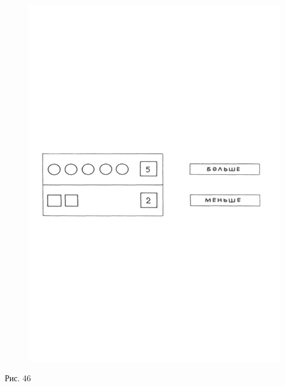 \documentclass[a5paper]{book}
\begin{document}
\begin{figure}
\centering
\includegraphics[width=\linewidth]{media/media/image42.png}
\end{figure}

Рис. 46
\end{document}
